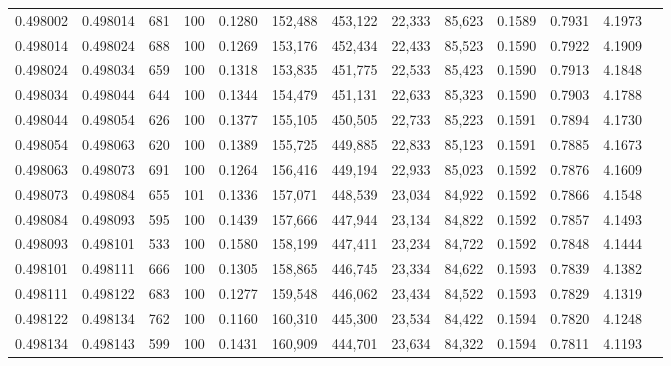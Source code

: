 \begin{tabular}{rrrrrrrrrrrrr}
0.498002 & 0.498014 &   681 & 100 &                                     0.1280 & 152,488 & 453,122 &  22,333 &  85,623 & 0.1589 & 0.7931 & 4.1973 \\
0.498014 & 0.498024 &   688 & 100 &                                     0.1269 & 153,176 & 452,434 &  22,433 &  85,523 & 0.1590 & 0.7922 & 4.1909 \\
0.498024 & 0.498034 &   659 & 100 &                                     0.1318 & 153,835 & 451,775 &  22,533 &  85,423 & 0.1590 & 0.7913 & 4.1848 \\
0.498034 & 0.498044 &   644 & 100 &                                     0.1344 & 154,479 & 451,131 &  22,633 &  85,323 & 0.1590 & 0.7903 & 4.1788 \\
0.498044 & 0.498054 &   626 & 100 &                                     0.1377 & 155,105 & 450,505 &  22,733 &  85,223 & 0.1591 & 0.7894 & 4.1730 \\
0.498054 & 0.498063 &   620 & 100 &                                     0.1389 & 155,725 & 449,885 &  22,833 &  85,123 & 0.1591 & 0.7885 & 4.1673 \\
0.498063 & 0.498073 &   691 & 100 &                                     0.1264 & 156,416 & 449,194 &  22,933 &  85,023 & 0.1592 & 0.7876 & 4.1609 \\
0.498073 & 0.498084 &   655 & 101 &                                     0.1336 & 157,071 & 448,539 &  23,034 &  84,922 & 0.1592 & 0.7866 & 4.1548 \\
0.498084 & 0.498093 &   595 & 100 &                                     0.1439 & 157,666 & 447,944 &  23,134 &  84,822 & 0.1592 & 0.7857 & 4.1493 \\
0.498093 & 0.498101 &   533 & 100 &                                     0.1580 & 158,199 & 447,411 &  23,234 &  84,722 & 0.1592 & 0.7848 & 4.1444 \\
0.498101 & 0.498111 &   666 & 100 &                                     0.1305 & 158,865 & 446,745 &  23,334 &  84,622 & 0.1593 & 0.7839 & 4.1382 \\
0.498111 & 0.498122 &   683 & 100 &                                     0.1277 & 159,548 & 446,062 &  23,434 &  84,522 & 0.1593 & 0.7829 & 4.1319 \\
0.498122 & 0.498134 &   762 & 100 &                                     0.1160 & 160,310 & 445,300 &  23,534 &  84,422 & 0.1594 & 0.7820 & 4.1248 \\
0.498134 & 0.498143 &   599 & 100 &                                     0.1431 & 160,909 & 444,701 &  23,634 &  84,322 & 0.1594 & 0.7811 & 4.1193 \\

\end{tabular}
